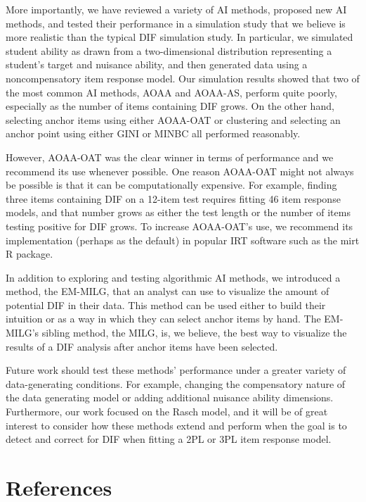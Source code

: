 \documentclass[
  11pt,
]{article}
\begin{document}
More importantly, we have reviewed a variety of AI methods, proposed new AI methods, and tested their performance in a simulation study that we believe is more realistic than the typical DIF simulation study. In particular, we simulated student ability as drawn from a two-dimensional distribution representing a student's target and nuisance ability, and then generated data using a noncompensatory item response model. Our simulation results showed that two of the most common AI methods, AOAA and AOAA-AS, perform quite poorly, especially as the number of items containing DIF grows. On the other hand, selecting anchor items using either AOAA-OAT or clustering and selecting an anchor point using either GINI or MINBC all performed reasonably.

However, AOAA-OAT was the clear winner in terms of performance and we recommend its use whenever possible. One reason AOAA-OAT might not always be possible is that it can be computationally expensive. For example, finding three items containing DIF on a 12-item test requires fitting 46 item response models, and that number grows as either the test length or the number of items testing positive for DIF grows. To increase AOAA-OAT's use, we recommend its implementation (perhaps as the default) in popular IRT software such as the mirt R package.

In addition to exploring and testing algorithmic AI methods, we introduced a method, the EM-MILG, that an analyst can use to visualize the amount of potential DIF in their data. This method can be used either to build their intuition or as a way in which they can select anchor items by hand. The EM-MILG's sibling method, the MILG, is, we believe, the best way to visualize the results of a DIF analysis after anchor items have been selected.

Future work should test these methods' performance under a greater variety of data-generating conditions. For example, changing the compensatory nature of the data generating model or adding additional nuisance ability dimensions. Furthermore, our work focused on the Rasch model, and it will be of great interest to consider how these methods extend and perform when the goal is to detect and correct for DIF when fitting a 2PL or 3PL item response model.

\clearpage

\hypertarget{references}{%
\section{References}\label{references}}
\end{document}
